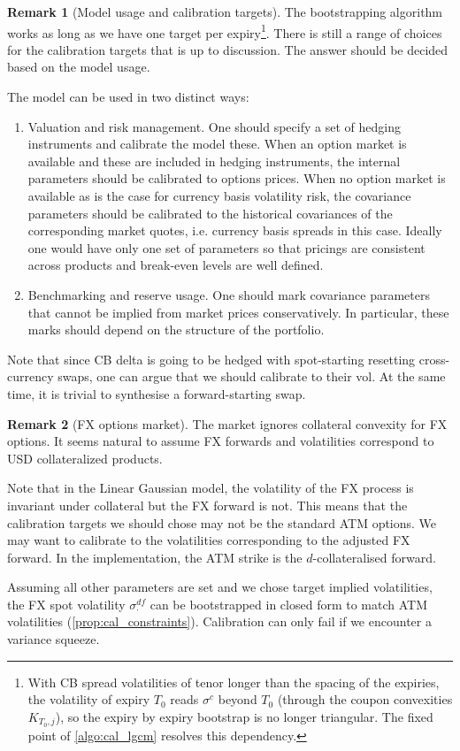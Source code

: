 \documentclass[11pt,english]{amsart}
\theoremstyle{definition}
\newtheorem{rema}{Remark}
\begin{document}
\begin{rema}[Model usage and calibration targets]
The bootstrapping algorithm works as long as we have one target per expiry\footnote{With CB spread volatilities of tenor longer than the spacing of the expiries, the volatility of expiry $T_0$ reads $\sigma^c$ beyond $T_0$ (through the coupon convexities $K_{T_0,j}$), so the expiry by expiry bootstrap is no longer triangular. The fixed point of \autoref{algo:cal_lgcm} resolves this dependency.}. There is still a range of choices for the calibration targets that is up to discussion. The answer should be decided based on the model usage.

The model can be used in two distinct ways:
\begin{enumerate}
\item Valuation and risk management. One should specify a set of hedging instruments and calibrate the model these. When an option market is available and these are included in hedging instruments, the internal parameters should be calibrated to options prices.  When no option market is available as is the case for currency basis volatility risk, the covariance parameters should be calibrated to the historical covariances of the corresponding market quotes, i.e. currency basis spreads in this case. Ideally one would have only one set of parameters so that pricings are consistent across products and break-even levels are well defined.
\item Benchmarking and reserve usage. One should mark covariance parameters that cannot be implied from market prices conservatively. In particular, these marks should depend on the structure of the portfolio.
\end{enumerate}

Note that since CB delta is going to be hedged with spot-starting resetting cross-currency swaps, one can argue that we should calibrate to their vol. At the same time, it is trivial to synthesise a forward-starting swap.
\end{rema}


\begin{rema}[FX options market]%
The market ignores collateral convexity for FX options. It seems natural to assume FX forwards and volatilities correspond to USD collateralized products.

Note that in the Linear Gaussian model, the volatility of the FX process is invariant under collateral but the FX forward is not. This means that the calibration targets we should chose may not be the standard ATM options. We may want to calibrate to the volatilities corresponding to the adjusted FX forward. In the implementation, the ATM strike is the $d$-collateralised forward.

Assuming all other parameters are set and we chose target implied volatilities, the FX spot volatility $\sigma^{df}_\cdot$ can be bootstrapped in closed form to match ATM volatilities (\autoref{prop:cal_constraints}). Calibration can only fail if we encounter a variance squeeze.
\end{rema}
\end{document}
